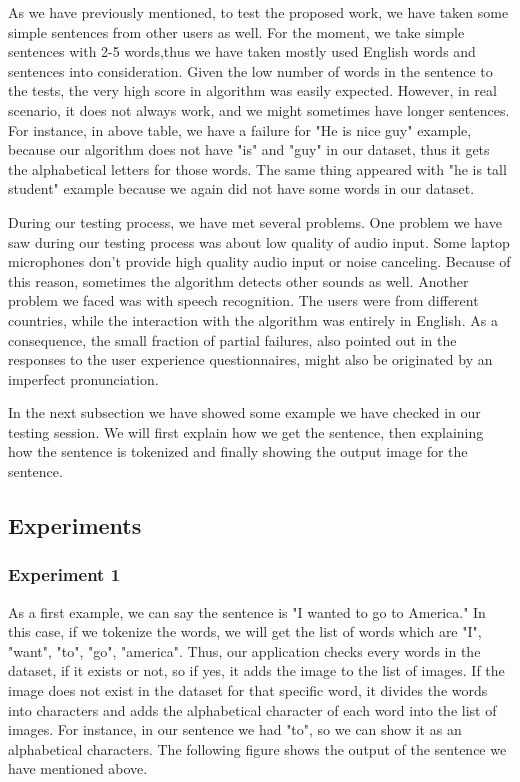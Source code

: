 \documentclass[twocolumn,10pt]{asme2ej}
\begin{document}
As we have previously mentioned, to test the proposed work, we have taken some simple sentences from other users as well. For the moment, we take simple sentences with 2-5 words,thus we have taken mostly used English words and sentences into consideration. Given the low number of words in the sentence to the tests, the very high score in algorithm was easily expected. However, in real scenario, it does not always work, and we might sometimes have longer sentences. For instance, in above table, we have a failure for "He is nice guy" example, because our algorithm does not have "is" and "guy" in our dataset, thus it gets the alphabetical letters for those words. The same thing appeared with "he is tall student" example because we again did not have some words in our dataset. 

During our testing process, we have met several problems. One problem we have saw during our testing process was about low quality of audio input. Some laptop microphones don't provide high quality audio input or noise canceling. Because of this reason, sometimes the algorithm detects other sounds as well. Another problem we faced was with speech recognition. The users were from different countries, while the interaction with the algorithm was entirely in English. As a consequence, the small fraction of partial failures, also pointed out in the responses to the user experience questionnaires, might also be originated by an imperfect pronunciation.

In the next subsection we have showed some example we have checked in our testing session. We will first explain how we get the sentence, then explaining how the sentence is tokenized and finally showing the output image for the sentence.

\subsection{Experiments}
\subsubsection{Experiment 1}
As a first example, we can say the sentence is "I wanted to go to America." In this case, if we tokenize the words, we will get the list of words which are "I", "want", "to", "go", "america". Thus, our application checks every words in the dataset, if it exists or not, so if yes, it adds the image to the list of images. If the image does not exist in the dataset for that specific word, it divides the words into characters and adds the alphabetical character of each word into the list of images. For instance, in our sentence we had "to", so we can show it as an alphabetical characters. The following figure shows the output of the sentence we have mentioned above. 
\end{document}
